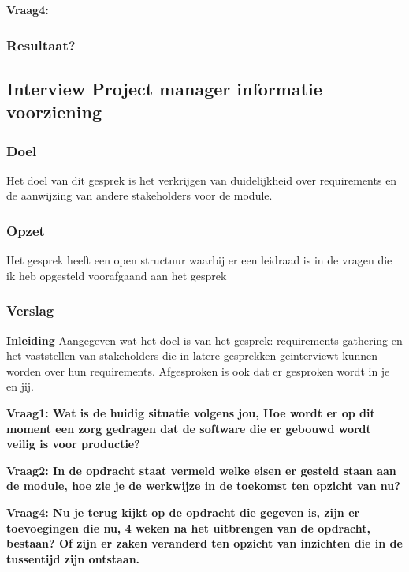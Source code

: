 \lipsum[09]
\bigskip

\textbf{Vraag4: }

\lipsum[07]

\subsubsection{Resultaat?}

\subsection{Interview Project manager informatie voorziening }

\subsubsection{Doel}
Het doel van dit gesprek is het verkrijgen van duidelijkheid over requirements en de aanwijzing van andere stakeholders voor de module.

\subsubsection{Opzet}
Het gesprek heeft een open structuur waarbij er een leidraad is in de vragen die ik heb opgesteld voorafgaand aan het gesprek

\subsubsection{Verslag}
\textbf{Inleiding}
Aangegeven wat het doel is van het gesprek: requirements gathering en het vaststellen van stakeholders die in latere gesprekken geinterviewt kunnen worden over hun requirements. Afgesproken is ook dat er gesproken wordt in je en jij.

\bigskip

\textbf{Vraag1: Wat is de huidig situatie volgens jou, Hoe wordt er op dit moment een zorg gedragen dat de software die er gebouwd wordt veilig is voor productie?}

\lipsum[01]
\bigskip

\textbf{Vraag2: In de opdracht staat vermeld welke eisen er gesteld staan aan de module, hoe zie je de werkwijze in de toekomst ten opzicht van nu?}

\lipsum[03]
\bigskip

\textbf{Vraag4: Nu je terug kijkt op de opdracht die gegeven is, zijn er toevoegingen die nu, 4 weken na het uitbrengen van de opdracht, bestaan? Of zijn er zaken veranderd ten opzicht van inzichten die in de tussentijd zijn ontstaan.}

